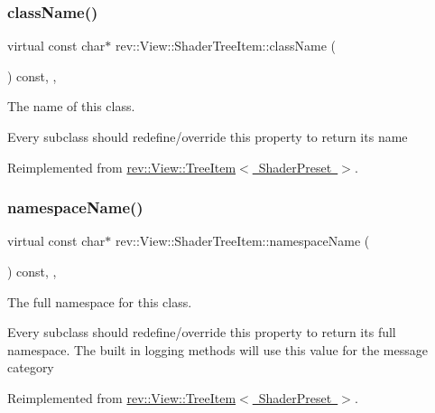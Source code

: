 \subsubsection{\texorpdfstring{className()}{className()}}
{\footnotesize\ttfamily virtual const char$\ast$ rev\+::\+View\+::\+Shader\+Tree\+Item\+::class\+Name (\begin{DoxyParamCaption}{ }\end{DoxyParamCaption}) const\hspace{0.3cm}{\ttfamily [inline]}, {\ttfamily [override]}, {\ttfamily [virtual]}}



The name of this class. 

Every subclass should redefine/override this property to return its name 

Reimplemented from \mbox{\hyperlink{classrev_1_1_view_1_1_tree_item_a8a12a6ceece6cab7a2299da2b5e6a54b}{rev\+::\+View\+::\+Tree\+Item$<$ Shader\+Preset $>$}}.

\mbox{\label{classrev_1_1_view_1_1_shader_tree_item_a684fab698c34ef0456cb86ec590b6385}} 
\subsubsection{\texorpdfstring{namespaceName()}{namespaceName()}}
{\footnotesize\ttfamily virtual const char$\ast$ rev\+::\+View\+::\+Shader\+Tree\+Item\+::namespace\+Name (\begin{DoxyParamCaption}{ }\end{DoxyParamCaption}) const\hspace{0.3cm}{\ttfamily [inline]}, {\ttfamily [override]}, {\ttfamily [virtual]}}



The full namespace for this class. 

Every subclass should redefine/override this property to return its full namespace. The built in logging methods will use this value for the message category 

Reimplemented from \mbox{\hyperlink{classrev_1_1_view_1_1_tree_item_a3bb552a87176f4b12848e43dfdd287b2}{rev\+::\+View\+::\+Tree\+Item$<$ Shader\+Preset $>$}}.

\mbox{\label{classrev_1_1_view_1_1_shader_tree_item_af7456acaae6ab27a4c215a1ee9cdf930}} 
